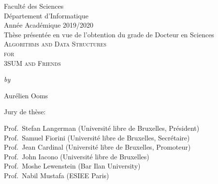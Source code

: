 
\thispagestyle{ulb_header_style}
\vspace*{\fill}
\begin{center}
Facult\'{e} des Sciences\\[1.5pt]
D\'{e}partement d'Informatique \\[1.5pt]
Ann\'{e}e Acad\'{e}mique 2019/2020 \\[1cm]
Th\`{e}se pr\'{e}sent\'{e}e en vue de l'obtention du grade de Docteur en Sciences \\[2cm]
{\scshape\huge Algorithms and Data Structures}\\[12pt]
{\scshape\huge for}\\[12pt]
{\scshape\huge 3SUM and Friends}
\end{center}

\begin{center}
\vspace{1cm}
{\small\itshape by}
\end{center}

\begin{center}
\vspace{0.5cm}
{\large Aurélien Ooms} \\[2cm]
\end{center}

\begin{center}
	Jury de th\`{e}se:
\end{center}
\begin{flushleft}
Prof.~Stefan Langerman (Université libre de Bruxelles, Président) \\
Prof.~Samuel Fiorini (Université libre de Bruxelles, Secrétaire) \\
Prof.~Jean Cardinal (Université libre de Bruxelles, Promoteur) \\
Prof.~John Iacono (Université libre de Bruxelles) \\
Prof.~Moshe Lewenstein (Bar Ilan University) \\
Prof.~Nabil Mustafa (ESIEE Paris)
\end{flushleft}
\vspace*{\fill}
